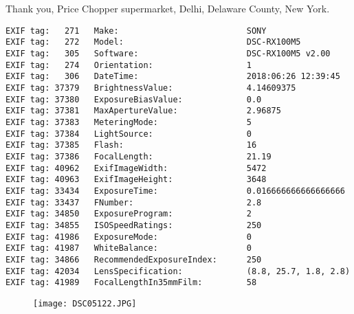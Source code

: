 \section{\protect{}}
\noindent Thank you, Price Chopper supermarket, Delhi, Delaware County, New York.
\noindent
\begin{lstlisting}
EXIF tag:   271   Make:                          SONY
EXIF tag:   272   Model:                         DSC-RX100M5
EXIF tag:   305   Software:                      DSC-RX100M5 v2.00
EXIF tag:   274   Orientation:                   1
EXIF tag:   306   DateTime:                      2018:06:26 12:39:45
EXIF tag: 37379   BrightnessValue:               4.14609375
EXIF tag: 37380   ExposureBiasValue:             0.0
EXIF tag: 37381   MaxApertureValue:              2.96875
EXIF tag: 37383   MeteringMode:                  5
EXIF tag: 37384   LightSource:                   0
EXIF tag: 37385   Flash:                         16
EXIF tag: 37386   FocalLength:                   21.19
EXIF tag: 40962   ExifImageWidth:                5472
EXIF tag: 40963   ExifImageHeight:               3648
EXIF tag: 33434   ExposureTime:                  0.016666666666666666
EXIF tag: 33437   FNumber:                       2.8
EXIF tag: 34850   ExposureProgram:               2
EXIF tag: 34855   ISOSpeedRatings:               250
EXIF tag: 41986   ExposureMode:                  0
EXIF tag: 41987   WhiteBalance:                  0
EXIF tag: 34866   RecommendedExposureIndex:      250
EXIF tag: 42034   LensSpecification:             (8.8, 25.7, 1.8, 2.8)
EXIF tag: 41989   FocalLengthIn35mmFilm:         58

\end{lstlisting}
\clearpage
\begin{figure}
\raggedleft
\texttt{[image: DSC05122.JPG]}
\end{figure}


\clearpage
